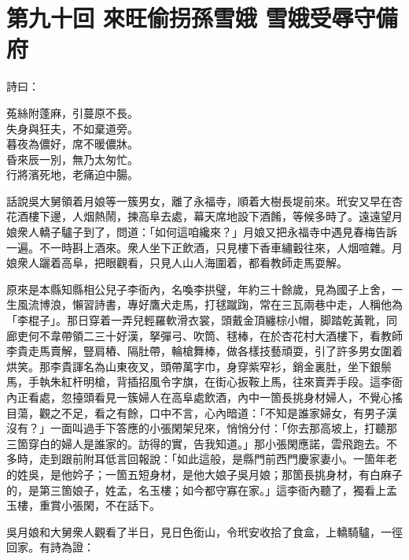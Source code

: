 
\chapter*{第九十回 來旺偷拐孫雪娥 雪娥受辱守備府}


詩曰：

\begin{myquote}
菟絲附蓬麻，引蔓原不長。\\失身與狂夫，不如棄道旁。\\暮夜為儂好，席不暖儂牀。\\昏來辰一別，無乃太匆忙。\\行將濱死地，老痛迫中腸。
\end{myquote}

話說吳大舅領着月娘等一簇男女，離了永福寺，順着大樹長堤前來。玳安又早在杏花酒樓下邊，人烟熱鬧，揀高阜去處，幕天席地設下酒餚，等候多時了。遠遠望月娘衆人轎子驢子到了，問道：「如何這咱纔來？」月娘又把永福寺中遇見春梅告訴一遍。不一時斟上酒來。衆人坐下正飲酒，只見樓下香車繡轂往來，人烟喧雜。月娘衆人躧着高阜，把眼觀看，只見人山人海圍着，都看教師走馬耍解。

原來是本縣知縣相公兒子李衙內，名喚李拱璧，年約三十餘歲，見為國子上舍，一生風流博浪，懶習詩書，專好鷹犬走馬，打毬蹴踘，常在三瓦兩巷中走，人稱他為「李棍子」。那日穿着一弄兒輕羅軟滑衣裳，頭戴金頂纏棕小帽，脚踏乾黃靴，同廊吏何不韋帶領二三十好漢，拏彈弓、吹筒、毬棒，在於杏花村大酒樓下，看教師李貴走馬賣解，豎肩樁、隔肚帶，輪槍舞棒，做各樣技藝頑耍，引了許多男女圍着烘笑。那李貴諢名為山東夜叉，頭帶萬字巾，身穿紫窄衫，銷金裏肚，坐下銀鬃馬，手執朱紅杆明槍，背插招風令字旗，在街心扳鞍上馬，往來賣弄手段。這李衙內正看處，忽擡頭看見一簇婦人在高阜處飲酒，內中一箇長挑身材婦人，不覺心搖目蕩，觀之不足，看之有餘，口中不言，心內暗道：「不知是誰家婦女，有男子漢沒有？」{}一面叫過手下答應的小張閑架兒來，悄悄分付：「你去那高坡上，打聽那三箇穿白的婦人是誰家的。訪得的實，告我知道。」那小張閑應諾，雲飛跑去。不多時，走到跟前附耳低言回報說：「如此這般，是縣門前西門慶家妻小。一箇年老的姓吳，是他妗子；一箇五短身材，是他大娘子吳月娘；那箇長挑身材，有白麻子的，是第三箇娘子，姓孟，名玉樓；如今都守寡在家。」這李衙內聽了，獨看上孟玉樓，重賞小張閑，不在話下。

吳月娘和大舅衆人觀看了半日，見日色銜山，令玳安收拾了食盒，上轎騎驢，一徑回家。有詩為證：

